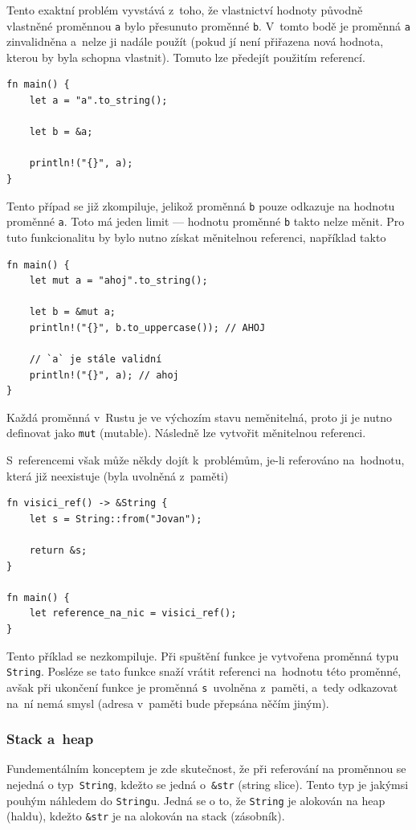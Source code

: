 \documentclass[a4paper, 12pt, twoside]{article} %
\newcommand{\rust}[1]{\texttt{#1}}
\begin{document}
				Tento exaktní problém vyvstává z~toho, že vlastnictví hodnoty původně vlastněné proměnnou \texttt{a} bylo přesunuto proměnné \texttt{b}. V~tomto bodě je proměnná \texttt{a} zinvalidněna a~nelze ji nadále použít (pokud jí není přiřazena nová hodnota, kterou by byla schopna vlastnit). Tomuto lze předejít použitím referencí.
				\begin{verbatim}
fn main() {
	let a = "a".to_string();
	
	let b = &a;
	
	println!("{}", a);
}
				\end{verbatim}
		
				Tento případ se již zkompiluje, jelikož proměnná \texttt{b} pouze odkazuje na hodnotu proměnné \texttt{a}. Toto má jeden limit — hodnotu proměnné \texttt{b} takto nelze měnit. Pro tuto funkcionalitu by bylo nutno získat měnitelnou referenci, například takto
				\begin{verbatim}
fn main() {
	let mut a = "ahoj".to_string();
	
	let b = &mut a;
	println!("{}", b.to_uppercase()); // AHOJ

	// `a` je stále validní
	println!("{}", a); // ahoj
}
				\end{verbatim}
	
				Každá proměnná v~Rustu je ve výchozím stavu neměnitelná, proto ji je nutno definovat jako \texttt{mut} (mutable). Následně lze vytvořit měnitelnou referenci.
				
				S~referencemi však může někdy dojít k~problémům, je-li referováno na~hodnotu, která již neexistuje (byla uvolněná z~paměti)
				\begin{verbatim}
fn visici_ref() -> &String {
	let s = String::from("Jovan");

	return &s;
}

fn main() {
	let reference_na_nic = visici_ref();
}
				\end{verbatim}
				\cite{dangle}
					
				Tento příklad se nezkompiluje. Při spuštění funkce je vytvořena proměnná typu \rust{String}. Posléze se tato funkce snaží vrátit referenci na~hodnotu této proměnné, avšak při ukončení funkce je proměnná \texttt{s}~uvolněna z~paměti, a~tedy odkazovat na~ní nemá smysl (adresa v~paměti bude přepsána něčím jiným).
			
			\subsubsection*{Stack a~heap}
				Fundementálním konceptem je zde skutečnost, že při referování na proměnnou se nejedná o typ~\texttt{String}, kdežto se jedná o~\texttt{\&str} (string slice). Tento typ je jakýmsi pouhým náhledem do \texttt{String}u. Jedná se o to, že \texttt{String} je alokován na heap (haldu), kdežto \texttt{\&str} je na alokován na stack (zásobník).
				
\end{document}
